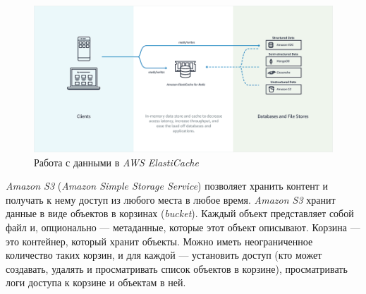 \begin{figure}[!h]
	\centering
	\includegraphics[width=\textwidth]{figures/elasti-cache.png}
	\caption{Работа с данными в \textit{AWS ElastiCache}}
	\label{fig:elasti-cache}
\end{figure}

\textit{Amazon S3} (\textit{Amazon Simple Storage Service}) позволяет хранить контент и получать к нему доступ из любого места в любое время. \textit{Amazon S3} хранит данные в виде объектов в корзинах (\textit{bucket}). Каждый объект представляет собой файл и, опционально — метаданные, которые этот объект описывают. Корзина — это контейнер, который хранит объекты. Можно иметь неограниченное количество таких корзин, и для каждой — установить доступ (кто может создавать, удалять и просматривать список объектов в корзине), просматривать логи доступа к корзине и объектам в ней.



